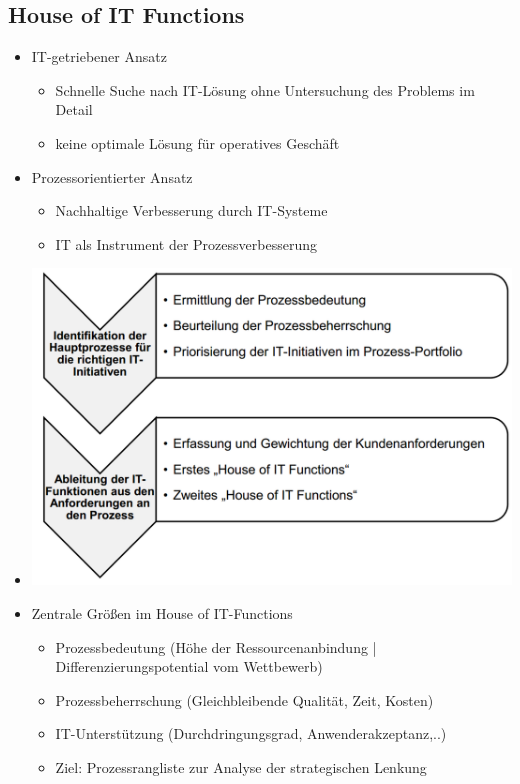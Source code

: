 \documentclass[11pt,a4paper]{article}
\begin{document}
\subsection{House of IT Functions}
\begin{itemize}
\item IT-getriebener Ansatz
	\begin{itemize}
	\item Schnelle Suche nach IT-Lösung ohne Untersuchung des Problems im Detail
	\item keine optimale Lösung für operatives Geschäft
	\end{itemize}
	
\item Prozessorientierter Ansatz
	\begin{itemize}
	\item Nachhaltige Verbesserung durch IT-Systeme
	\item IT als Instrument der Prozessverbesserung
	\end{itemize}
	
\item[] \includegraphics[width=15cm]{itprozess}

\item Zentrale Größen im House of IT-Functions
	\begin{itemize}
	\item Prozessbedeutung (Höhe der Ressourcenanbindung | Differenzierungspotential vom Wettbewerb)
	\item Prozessbeherrschung (Gleichbleibende Qualität, Zeit, Kosten)
	\item IT-Unterstützung (Durchdringungsgrad, Anwenderakzeptanz,..)
	\item Ziel: Prozessrangliste zur Analyse der strategischen Lenkung
	\end{itemize}


\end{itemize}
\end{document}
